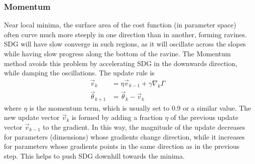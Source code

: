 \documentclass[twoside,english]{uiofysmaster}
\begin{document}
\subsubsection{Momentum}
Near local minima, the surface area of the cost function (in parameter space) often curve much more steeply in one 
direction than in another, forming ravines. SDG will have slow converge in such regions, as it will oscillate across the slopes
while having slow progress along the bottom of the ravine. The Momentum method \cite{Qian99} avoids this problem
by accelerating SDG in the downwards direction, while damping the oscillations. The update rule is
\begin{equation}
\begin{aligned}
 \vec{v}_{k} &= \eta \vec{v}_{k-1} + \gamma \nabla_k \Gamma \\
 \vec{\theta}_{k+1} &= \vec{\theta}_k - \vec{v}_k
\end{aligned}
\label{Momentum}
\end{equation}
where $\eta$ is the momentum term, which is usually set to 0.9 or a similar value. The new update vector $\vec{v}_k$ 
is formed by adding a fraction $\eta$ of the previous update vector $\vec{v}_{k-1}$ to the gradient. In this way, the magnitude
of the update decreases for parameters (dimensions) whose gradients change direction, while it increases for parameters
whose gradients points in the same direction as in the previous step. This helps to push SDG downhill towards the minima. 
\end{document}
